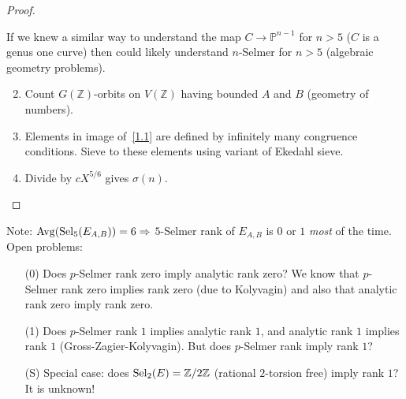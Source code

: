 \documentclass[12pt,amsfont]{amsart}
\begin{document}
\begin{proof}
\begin{rmk} If we knew a similar way to understand the map $C \rightarrow \mathbb{P}^{n-1}$ for $n > 5$ ($C$ is a genus one curve) then could likely understand $n$-Selmer for $n > 5$ (algebraic geometry problems). 
\end{rmk}
\begin{enumerate}[\normalfont (a)]
\setcounter{enumi}{1}
\item\label{1.3b}
Count $G(\mathbb{Z})$-orbits on $V(\mathbb{Z})$ having bounded $A$ and $B$ (geometry of numbers).
\item
Elements in image of~\eqref{1.1} are defined by infinitely many congruence conditions. Sieve to these elements using variant of Ekedahl sieve. 
\item
Divide by $cX^{5/6}$ gives $\sigma(n)$. 
\end{enumerate}
\end{proof}
Note: $\operatorname{Avg}(\operatorname{Sel}_5(E_{A,B})) = 6 \Rightarrow$ $5$-Selmer rank of $E_{A,B}$ is $0$ or $1$ \emph{most} of the time. \\
Open problems: 
\begin{enumerate}
\item[(0)]
Does $p$-Selmer rank zero imply analytic rank zero? We know that $p$-Selmer rank zero implies rank zero (due to Kolyvagin)  and also that analytic rank zero imply rank zero.
\item[(1)]
Does $p$-Selmer rank $1$ implies analytic rank $1$, and analytic rank $1$ implies rank $1$ (Gross-Zagier-Kolyvagin). But does $p$-Selmer rank imply rank $1$?
\item[(S)]
Special case: does $\operatorname{Sel}_2(E) = {\mathbb Z}/2 {\mathbb Z}$ (rational $2$-torsion free) imply rank $1$? It is unknown!
\end{enumerate}
\begingroup
\renewcommand{\addcontentsline}[3]{}%
\endgroup


\newpage
\renewcommand{\thesubsection}{\arabic{section}.\arabic{subsection}}
\end{document}
